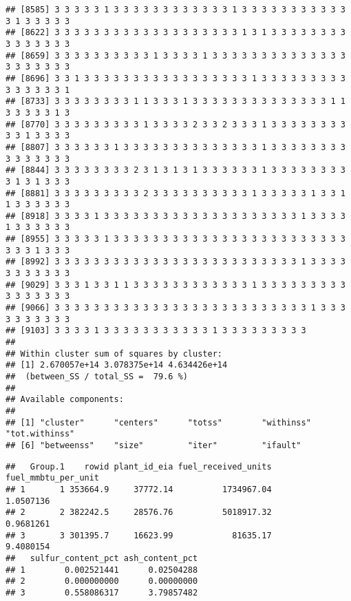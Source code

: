 \documentclass[
]{article}
\newenvironment{Shaded}{\begin{snugshade}}{\end{snugshade}}
\newcommand{\AttributeTok}[1]{\textcolor[rgb]{0.77,0.63,0.00}{#1}}
\newcommand{\CommentTok}[1]{\textcolor[rgb]{0.56,0.35,0.01}{\textit{#1}}}
\newcommand{\FunctionTok}[1]{\textcolor[rgb]{0.00,0.00,0.00}{#1}}
\newcommand{\NormalTok}[1]{#1}
\newcommand{\SpecialCharTok}[1]{\textcolor[rgb]{0.00,0.00,0.00}{#1}}
\begin{document}
\begin{verbatim}
## [8585] 3 3 3 3 3 1 3 3 3 3 3 3 3 3 3 3 3 3 1 3 3 3 3 3 3 3 3 3 3 3 3 1 3 3 3 3 3
## [8622] 3 3 3 3 3 3 3 3 3 3 3 3 3 3 3 3 3 3 3 1 3 1 3 3 3 3 3 3 3 3 3 3 3 3 3 3 3
## [8659] 3 3 3 3 3 3 3 3 3 3 1 3 3 3 3 1 3 3 3 3 3 3 3 3 3 3 3 3 3 3 3 3 3 3 3 3 3
## [8696] 3 3 1 3 3 3 3 3 3 3 3 3 3 3 3 3 3 3 3 3 1 3 3 3 3 3 3 3 3 3 3 3 3 3 3 3 1
## [8733] 3 3 3 3 3 3 3 3 1 1 3 3 3 1 3 3 3 3 3 3 3 3 3 3 3 3 3 3 1 1 3 3 3 3 3 1 3
## [8770] 3 3 3 3 3 3 3 3 3 1 3 3 3 3 2 3 3 2 3 3 3 1 3 3 3 3 3 3 3 3 3 3 1 3 3 3 3
## [8807] 3 3 3 3 3 3 1 3 3 3 3 3 3 3 3 3 3 3 3 3 3 1 3 3 3 3 3 3 3 3 3 3 3 3 3 3 3
## [8844] 3 3 3 3 3 3 3 3 2 3 1 3 1 3 1 3 3 3 3 3 3 1 3 3 3 3 3 3 3 3 3 1 3 1 3 3 3
## [8881] 3 3 3 3 3 3 3 3 3 2 3 3 3 3 3 3 3 3 3 3 1 3 3 3 3 3 1 3 3 1 1 3 3 3 3 3 3
## [8918] 3 3 3 3 1 3 3 3 3 3 3 3 3 3 3 3 3 3 3 3 3 3 3 3 3 1 3 3 3 3 1 3 3 3 3 3 3
## [8955] 3 3 3 3 3 1 3 3 3 3 3 3 3 3 3 3 3 3 3 3 3 3 3 3 3 3 3 3 3 3 3 3 3 1 3 3 3
## [8992] 3 3 3 3 3 3 3 3 3 3 3 3 3 3 3 3 3 3 3 3 3 3 3 3 3 1 3 3 3 3 3 3 3 3 3 3 3
## [9029] 3 3 3 1 3 3 1 1 3 3 3 3 3 3 3 3 3 3 3 3 1 3 3 3 3 3 3 3 3 3 3 3 3 3 3 3 3
## [9066] 3 3 3 3 3 3 3 3 3 3 3 3 3 3 3 3 3 3 3 3 3 3 3 3 3 3 1 3 3 3 3 3 3 3 3 3 3
## [9103] 3 3 3 3 1 3 3 3 3 3 3 3 3 3 3 3 1 3 3 3 3 3 3 3 3 3
## 
## Within cluster sum of squares by cluster:
## [1] 2.670057e+14 3.078375e+14 4.634426e+14
##  (between_SS / total_SS =  79.6 %)
## 
## Available components:
## 
## [1] "cluster"      "centers"      "totss"        "withinss"     "tot.withinss"
## [6] "betweenss"    "size"         "iter"         "ifault"
\end{verbatim}

\begin{Shaded}
\end{Shaded}

\begin{verbatim}
##   Group.1    rowid plant_id_eia fuel_received_units fuel_mmbtu_per_unit
## 1       1 353664.9     37772.14          1734967.04           1.0507136
## 2       2 382242.5     28576.76          5018917.32           0.9681261
## 3       3 301395.7     16623.99            81635.17           9.4080154
##   sulfur_content_pct ash_content_pct
## 1        0.002521441      0.02504288
## 2        0.000000000      0.00000000
## 3        0.558086317      3.79857482
\end{verbatim}
\end{document}
